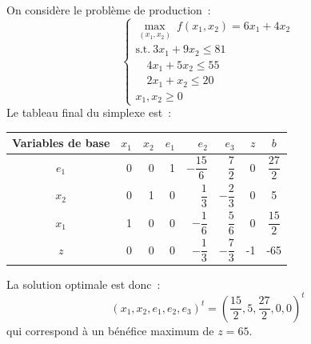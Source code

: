 \documentclass[a4paper,12pt,openany]{book}
\theoremstyle{plain}
\theoremstyle{definition}
\theoremstyle{remark}
\theoremstyle{nbstyle}
\begin{document}
	On considère le problème de production~:
	\[
	\left\{
	\begin{array}{l}
	\displaystyle\max_{(x_{1}, x_{2})} \ f(x_{1}, x_{2}) = 6 x_{1} + 4 x_{2} \\
	\text{s.t.} \ 3 x_{1} + 9 x_{2} \leq 81 \\
	\quad 4 x_{1} + 5 x_{2} \leq 55 \\
	\quad 2 x_{1} + x_{2} \leq 20 \\
	x_{1}, x_{2} \geq 0
	\end{array}
	\right.
	\]
	Le tableau final du simplexe est~:
	\begin{center}
		\begin{tabular}{|c|rrrrrr|c|}
			\toprule
			Variables de base & $x_{1}$ & $x_{2}$ & $e_{1}$ & $e_{2}$ & $e_{3}$ & $z$ & $b$ \\
			\hline
			$e_{1}$ & 0 & 0 & 1 & $-\dfrac{15}{6}$ & $\dfrac{7}{2}$ & 0 & $\dfrac{27}{2}$ \\
			$x_{2}$ & 0 & 1 & 0 & $\dfrac{1}{3}$ & $-\dfrac{2}{3}$ & 0 & 5 \\
			$x_{1}$ & 1 & 0 & 0 & $-\dfrac{1}{6}$ & $\dfrac{5}{6}$ & 0 & $\dfrac{15}{2}$ \\
			\hline
			$z$ & 0 & 0 & 0 & $-\dfrac{1}{3}$ & $-\dfrac{7}{3}$ & -1 & -65 \\
			\hline
		\end{tabular}
	\end{center}
	La solution optimale est donc~:
	\[
	(x_{1}, x_{2}, e_{1}, e_{2}, e_{3})^{t} = \left( \dfrac{15}{2}, 5, \dfrac{27}{2}, 0, 0 \right)^{t}
	\]
	qui correspond à un bénéfice maximum de $z = 65$.
	
\end{document}
